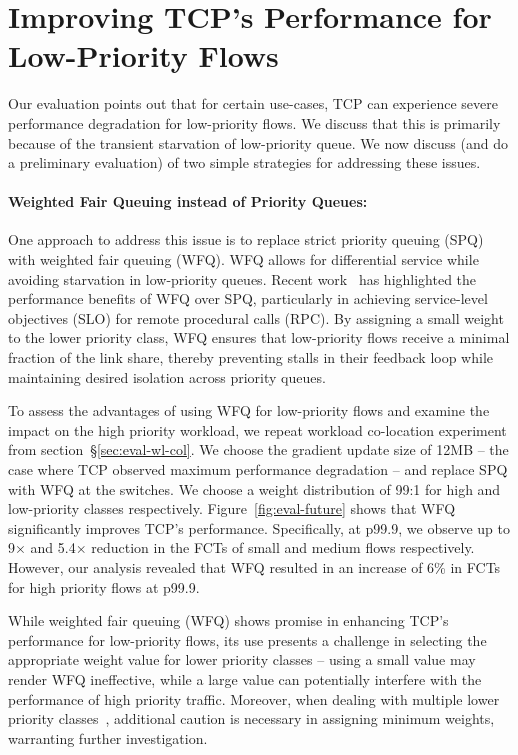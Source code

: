 \section{{Improving TCP's Performance for Low-Priority Flows}}
\label{sec:future}
Our evaluation points out that for certain use-cases, TCP can experience severe performance degradation for low-priority flows. We discuss that this is primarily because of the transient starvation of low-priority queue. We now discuss (and do a preliminary evaluation) of two simple strategies for addressing these issues. 

\paragraph{\textbf{Weighted Fair Queuing instead of Priority Queues:}}
One approach to address this issue is to replace strict priority queuing (SPQ) with weighted fair queuing (WFQ). WFQ allows for differential service while avoiding starvation in low-priority queues. Recent work~\cite{aequitas} has highlighted the performance benefits of WFQ over SPQ, particularly in achieving service-level objectives (SLO) for remote procedural calls (RPC). By assigning a small weight to the lower priority class, WFQ ensures that low-priority flows receive a minimal fraction of the link share, thereby preventing stalls in their feedback loop while maintaining desired isolation across priority queues. 

To assess the advantages of using WFQ for low-priority flows and examine the impact on the high priority workload, we repeat workload co-location experiment from section~\S\ref{sec:eval-wl-col}. We choose the gradient update size of 12MB -- the case where TCP observed maximum performance degradation -- and replace SPQ with WFQ at the switches. We choose a weight distribution of 99:1 for high and low-priority classes respectively. 
Figure~\ref{fig:eval-future} shows that WFQ significantly improves TCP's performance. Specifically, at p99.9, we observe up to 9$\times$ and 5.4$\times$ reduction in the FCTs of small and medium flows respectively. However, our analysis revealed that WFQ resulted in an increase of 6\% in FCTs for high priority flows at p99.9.

While weighted fair queuing (WFQ) shows promise in enhancing TCP's performance for low-priority flows, its use presents a challenge in selecting the appropriate weight value for lower priority classes -- using a small value may render WFQ ineffective, while a large value can potentially interfere with the performance of high priority traffic. Moreover, when dealing with multiple lower priority classes~\cite{auto,pias}, additional caution is necessary in assigning minimum weights, warranting further investigation.

